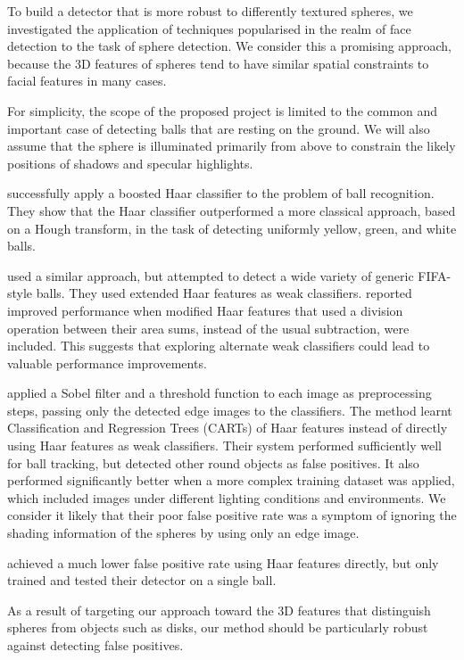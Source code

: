 \documentclass{llncs}
\begin{document}
{		To build a detector that is more robust to differently textured spheres, we investigated the application of techniques popularised in the realm of face detection to the task of sphere detection. We consider this a promising approach, because the 3D features of spheres tend to have similar spatial constraints to facial features in many cases.

		For simplicity, the scope of the proposed project is limited to the common and important case of detecting balls that are resting on the ground. We will also assume that the sphere is illuminated primarily from above to constrain the likely positions of shadows and specular highlights.

		\citet{masselli2013haar} successfully apply a boosted Haar classifier \citep{viola2001robust} to the problem of ball recognition. They show that the Haar classifier outperformed a more classical approach, based on a Hough transform, in the task of detecting uniformly yellow, green, and white balls.

		\citet{zhang2013novel} used a similar approach, but attempted to detect a wide variety of generic FIFA-style balls. They used extended Haar features \citep{Lienhart2002extended} as weak classifiers. \citet{zhang2013novel} reported improved performance when modified Haar features that used a division operation between their area sums, instead of the usual subtraction, were included. This suggests that exploring alternate weak classifiers could lead to valuable performance improvements.

		\citet{mitri2004fast} applied a Sobel filter and a threshold function to each image as preprocessing steps, passing only the detected edge images to the classifiers. The method learnt Classification and Regression Trees (CARTs) of Haar features instead of directly using Haar features as weak classifiers. Their system performed sufficiently well for ball tracking, but detected other round objects as false positives. It also performed significantly better when a more complex training dataset was applied, which included images under different lighting conditions and environments. We consider it likely that their poor false positive rate was a symptom of ignoring the shading information of the spheres by using only an edge image.

		\citet{treptow2004filter} achieved a much lower false positive rate using Haar features directly, but only trained and tested their detector on a single ball.

		As a result of targeting our approach toward the 3D features that distinguish spheres from objects such as disks, our method should be particularly robust against detecting false positives.

	}
\end{document}
